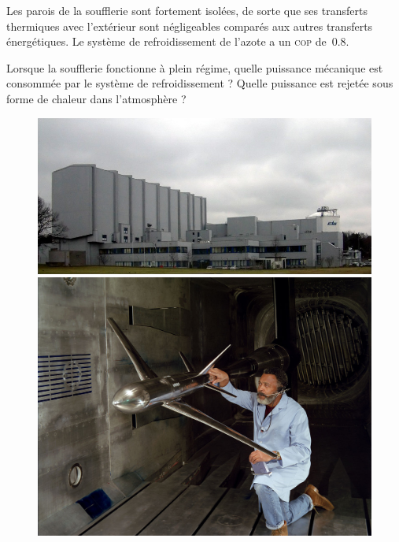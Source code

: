 	Les parois de la soufflerie sont fortement isolées, de sorte que ses transferts thermiques avec l’extérieur sont négligeables comparés aux autres transferts énergétiques. Le système de refroidissement de l’azote a un \textsc{cop} de~\num{0,8}.
	
	Lorsque la soufflerie fonctionne à plein régime, quelle puissance mécanique est consommée par le système de refroidissement ? Quelle puissance est rejetée sous forme de chaleur dans l’atmosphère ?

	\begin{figure}[htp]
		\begin{center}
			\includegraphics[width=0.8\columnwidth]{images/etw.jpg}
			\includegraphics[width=0.8\columnwidth]{images/langley_transonic.jpg}
		\end{center}
		\label{fig_souffleries}
	\end{figure}


